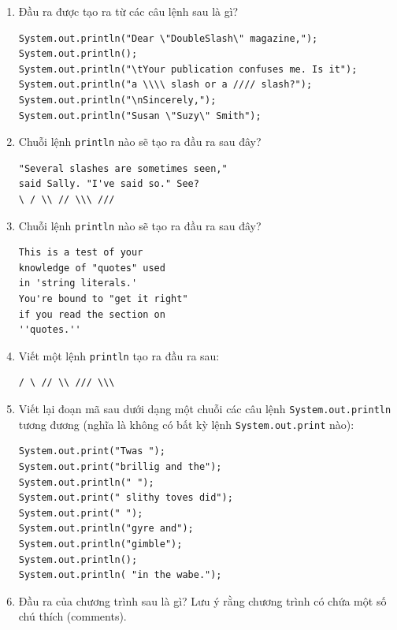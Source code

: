 \begin{enumerate}
\begin{verbatim}
System.out.println("\ta\tb\tc");
System.out.println("\\\\");
System.out.println("'");
System.out.println("\"\"\"");
System.out.println("C:\nin\the downward spiral");
\end{verbatim}
\item
  Đầu ra được tạo ra từ các câu lệnh sau là gì?

\begin{verbatim}
System.out.println("Dear \"DoubleSlash\" magazine,");
System.out.println();
System.out.println("\tYour publication confuses me. Is it");
System.out.println("a \\\\ slash or a //// slash?");
System.out.println("\nSincerely,");
System.out.println("Susan \"Suzy\" Smith");
\end{verbatim}
\item
  Chuỗi lệnh \texttt{println} nào sẽ tạo ra đầu ra sau đây?

\begin{verbatim}
"Several slashes are sometimes seen,"
said Sally. "I've said so." See?
\ / \\ // \\\ ///
\end{verbatim}
\item
  Chuỗi lệnh \texttt{println} nào sẽ tạo ra đầu ra sau đây?

\begin{verbatim}
This is a test of your
knowledge of "quotes" used
in 'string literals.'
You're bound to "get it right"
if you read the section on
''quotes.''
\end{verbatim}
\item
  Viết một lệnh \texttt{println} tạo ra đầu ra sau:

\begin{verbatim}
/ \ // \\ /// \\\
\end{verbatim}
\item
  Viết lại đoạn mã sau dưới dạng một chuỗi các câu lệnh
  \texttt{System.out.println} tương đương (nghĩa là không có bất kỳ lệnh
  \texttt{System.out.print} nào):

\begin{verbatim}
System.out.print("Twas ");
System.out.print("brillig and the");
System.out.println(" ");
System.out.print(" slithy toves did");
System.out.print(" ");
System.out.println("gyre and");
System.out.println("gimble");
System.out.println();
System.out.println( "in the wabe.");
\end{verbatim}
\item
  Đầu ra của chương trình sau là gì? Lưu ý rằng chương trình có chứa một
  số chú thích (comments).


\end{enumerate}

